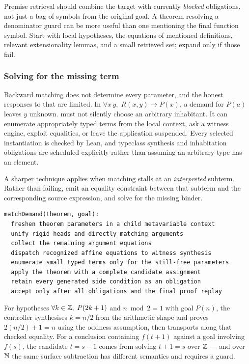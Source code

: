 Premise retrieval should combine the target with currently \emph{blocked}
obligations, not just a bag of symbols from the original goal. A theorem
resolving a denominator guard can be more useful than one mentioning the final
function symbol. Start with local hypotheses, the equations of mentioned
definitions, relevant extensionality lemmas, and a small retrieved set; expand
only if those fail.

\subsubsection*{Solving for the missing term}

Backward matching does not determine every parameter, and the honest responses
to that are limited. In $\forall x\,y,\;R(x,y)\to P(x)$, a demand for $P(a)$
leaves $y$ unknown. \forge{} must not silently choose an arbitrary inhabitant.
It can enumerate appropriately typed terms from the local context, ask a witness
engine, exploit equalities, or leave the application suspended. Every selected
instantiation is checked by Lean, and typeclass synthesis and inhabitation
obligations are scheduled explicitly rather than assuming an arbitrary type has
an element.

A sharper technique applies when matching stalls at an \emph{interpreted}
subterm. Rather than failing, emit an equality constraint between that subterm
and the corresponding source expression, and solve for the missing binder.

\begin{lstlisting}
matchDemand(theorem, goal):
  freshen theorem parameters in a child metavariable context
  unify rigid heads and directly matching arguments
  collect the remaining argument equations
  dispatch recognized affine equations to witness synthesis
  enumerate small typed terms only for the still-free parameters
  apply the theorem with a complete candidate assignment
  retain every generated side condition as an obligation
  accept only after all obligations and the final proof replay
\end{lstlisting}

For hypotheses $\forall k\in\mathbb{Z},\;P(2k+1)$ and $n\bmod 2=1$ with goal $P(n)$, the
controller synthesises $k=n/2$ from the arithmetic shape and proves
$2(n/2)+1=n$ using the oddness assumption, then transports along that checked
equality. For a conclusion containing $f(t+1)$ against a goal involving $f(s)$,
the candidate $t=s-1$ comes from solving $t+1=s$ over $\mathbb{Z}$ --- and over $\mathbb{N}$ the
same surface subtraction has different semantics and requires a guard.

